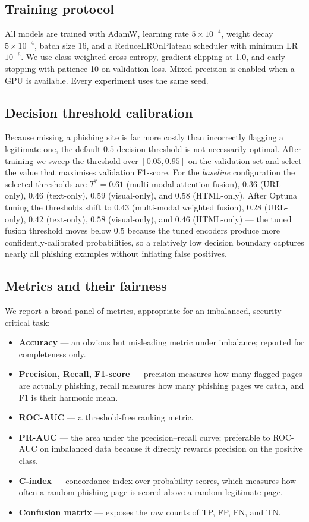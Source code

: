 \documentclass[conference]{IEEEtran}
\begin{document}
\subsection{Training protocol}
All models are trained with AdamW, learning rate
$5\!\times\!10^{-4}$, weight decay $5\!\times\!10^{-4}$, batch size
16, and a ReduceLROnPlateau scheduler with minimum LR $10^{-6}$.
We use class-weighted cross-entropy, gradient clipping at 1.0, and
early stopping with patience 10 on validation loss. Mixed precision
is enabled when a GPU is available. Every experiment uses the same
seed.

\subsection{Decision threshold calibration}
Because missing a phishing site is far more costly than incorrectly
flagging a legitimate one, the default $0.5$ decision threshold is
not necessarily optimal. After training we sweep the threshold
over $[0.05,0.95]$ on the validation set and select the value that
maximises validation F1-score. For the \emph{baseline} configuration
the selected thresholds are $T^{*}=0.61$ (multi-modal attention
fusion), $0.36$ (URL-only), $0.46$ (text-only), $0.59$ (visual-only),
and $0.58$ (HTML-only). After Optuna tuning the thresholds shift to
$0.43$ (multi-modal weighted fusion), $0.28$ (URL-only), $0.42$
(text-only), $0.58$ (visual-only), and $0.46$ (HTML-only) --- the
tuned fusion threshold moves below $0.5$ because the tuned encoders
produce more confidently-calibrated probabilities, so a relatively low
decision boundary captures nearly all phishing examples without
inflating false positives.

\subsection{Metrics and their fairness}
We report a broad panel of metrics, appropriate for an imbalanced,
security-critical task:
\begin{itemize}
  \item \textbf{Accuracy} --- an obvious but misleading metric
  under imbalance; reported for completeness only.
  \item \textbf{Precision, Recall, F1-score} --- precision measures
  how many flagged pages are actually phishing, recall measures
  how many phishing pages we catch, and F1 is their harmonic mean.
  \item \textbf{ROC-AUC} --- a threshold-free ranking metric.
  \item \textbf{PR-AUC} --- the area under the precision--recall
  curve; preferable to ROC-AUC on imbalanced data because it
  directly rewards precision on the positive class.
  \item \textbf{C-index} --- concordance-index over probability
  scores, which measures how often a random phishing page is
  scored above a random legitimate page.
  \item \textbf{Confusion matrix} --- exposes the raw counts of
  TP, FP, FN, and TN.
\end{itemize}
\end{document}
